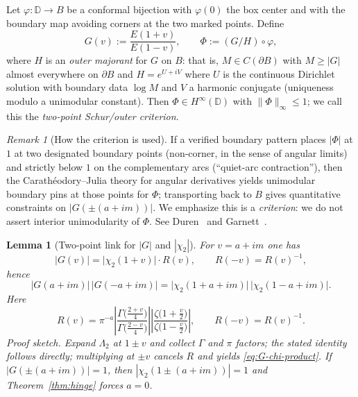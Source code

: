 \documentclass[11pt]{article}
\numberwithin{equation}{section}
\newtheorem{lemma}[theorem]{Lemma}
\theoremstyle{remark}
\newtheorem{remark}[theorem]{Remark}
\newcommand{\D}{\mathbb{D}}
\newcommand{\LamTwo}{\Lambda_2}
\begin{document}
Let $\varphi:\D\to B$ be a conformal bijection with $\varphi(0)$ the box center and with the boundary map avoiding corners at the two marked points. Define
\begin{equation}\label{eq:schur-def}
G(v):=\frac{E(1+v)}{E(1-v)},\qquad \Phi:=(G/H)\circ\varphi,
\end{equation}
where $H$ is an \emph{outer majorant} for $G$ on $B$: that is, $M\in C(\partial B)$ with $M\ge |G|$ almost everywhere on $\partial B$ and $H=e^{U+iV}$ where $U$ is the continuous Dirichlet solution with boundary data $\log M$ and $V$ a harmonic conjugate (uniqueness modulo a unimodular constant). Then $\Phi\in H^\infty(\D)$ with $\|\Phi\|_\infty\le 1$; we call this the \emph{two-point Schur/outer criterion}.

\begin{remark}[How the criterion is used]
If a verified boundary pattern places $|\Phi|$ at $1$ at two designated boundary points (non-corner, in the sense of angular limits) and strictly below $1$ on the complementary arcs (``quiet-arc contraction''), then the Carath\'eodory--Julia theory for angular derivatives yields unimodular boundary pins at those points for $\Phi$; transporting back to $B$ gives quantitative constraints on $|G(\pm(a+im))|$. We emphasize this is a \emph{criterion}: we do not assert interior unimodularity of $\Phi$. See Duren~\cite[Chs.~II, IV--V]{DurenHp} and Garnett~\cite[Chs.~II--III]{GarnettBAF}.
\end{remark}

\begin{lemma}[Two-point link for $|G|$ and $|\chi_2|$]\label{lem:G-chi-link}
For $v=a+im$ one has
\begin{equation}\label{eq:G-chi-link}
|G(v)|=\big|\chi_2(1+v)\big|\cdot R(v),\qquad R(-v)=R(v)^{-1},
\end{equation}
hence
\begin{equation}\label{eq:G-chi-product}
|G(a+im)|\,|G(-a+im)|
=\big|\chi_2(1+a+im)\big|\,\big|\chi_2(1-a+im)\big|.
\end{equation}
Here
\[
R(v)=\pi^{-a}\left|\frac{\Gamma\!\Big(\frac{2+v}{4}\Big)}{\Gamma\!\Big(\frac{2-v}{4}\Big)}\right|
\left|\frac{\zeta\!\big(1+\tfrac{v}{2}\big)}{\zeta\!\big(1-\tfrac{v}{2}\big)}\right|,
\qquad R(-v)=R(v)^{-1}.
\]
\emph{Proof sketch.}
Expand $\LamTwo$ at $1\pm v$ and collect $\Gamma$ and $\pi$ factors; the stated identity follows directly; multiplying at $\pm v$ cancels $R$ and yields \eqref{eq:G-chi-product}. If $|G(\pm(a+im))|=1$, then $|\chi_2(1\pm(a+im))|=1$ and Theorem~\ref{thm:hinge} forces $a=0$.
\end{lemma}
\end{document}
